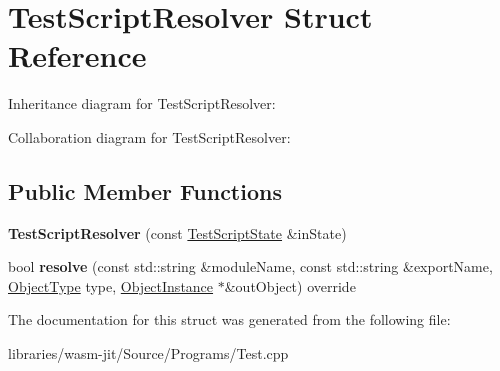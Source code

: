 \hypertarget{struct_test_script_resolver}{}\section{Test\+Script\+Resolver Struct Reference}
\label{struct_test_script_resolver}


Inheritance diagram for Test\+Script\+Resolver\+:


Collaboration diagram for Test\+Script\+Resolver\+:
\subsection*{Public Member Functions}
\begin{DoxyCompactItemize}
\item 
\mbox{\label{struct_test_script_resolver_aab6f494c8e5e9aaebf9950dfe6a98a25}} 
{\bfseries Test\+Script\+Resolver} (const \mbox{\hyperlink{struct_test_script_state}{Test\+Script\+State}} \&in\+State)
\item 
\mbox{\label{struct_test_script_resolver_aeb458d1e8cd220501232ecff82974eb6}} 
bool {\bfseries resolve} (const std\+::string \&module\+Name, const std\+::string \&export\+Name, \mbox{\hyperlink{struct_i_r_1_1_object_type}{Object\+Type}} type, \mbox{\hyperlink{struct_runtime_1_1_object_instance}{Object\+Instance}} $\ast$\&out\+Object) override
\end{DoxyCompactItemize}


The documentation for this struct was generated from the following file\+:\begin{DoxyCompactItemize}
\item 
libraries/wasm-\/jit/\+Source/\+Programs/Test.\+cpp\end{DoxyCompactItemize}
